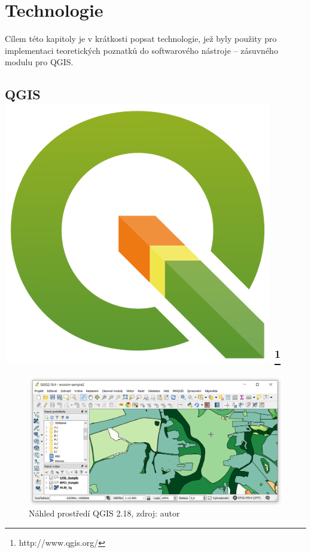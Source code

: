 \chapter{Technologie}
\label{3-technologie}
Cílem této kapitoly je v krátkosti popsat technologie, jež byly
použity pro implementaci teoretických poznatků do softwarového
nástroje – zásuvného modulu pro QGIS.

\section[QGIS]{QGIS \includegraphics[scale=0.055]{./pictures/qgis.png} 
\footnote{http://www.qgis.org/}}
\label{qgis}
\begin{figure}[H]
    \centering \includegraphics[scale=0.6]{./pictures/qgis_screen.png}
      \caption[Náhled prostředí QGIS 2.18]
      {Náhled prostředí QGIS 2.18, zdroj: autor}
      \label{screen:qgis}
\end{figure}
